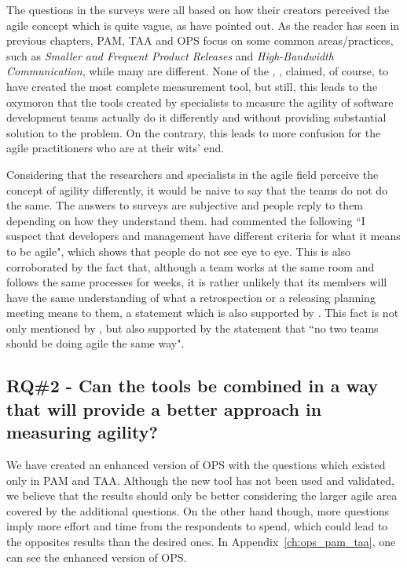 The questions in the surveys were all based on how their creators perceived the agile concept which is quite vague, as \citet{tsourveloudis} have pointed out. As the reader has seen in previous chapters, \ac{PAM}, \ac{TAA} and \ac{OPS} focus on some common areas/practices, such as  \textit{Smaller and Frequent Product Releases} and \textit{High-Bandwidth Communication}, while many are different. None of the \citet{sventha_dissertation}, \citet{pam}, \citet{Leffingwell} claimed, of course, to have created the most complete measurement tool, but still, this leads to the oxymoron that the tools created by specialists to measure the agility of software development teams actually do it differently and without providing substantial solution to the problem. On the contrary, this leads to more confusion for the agile practitioners who are at their wits' end.

Considering that the researchers and specialists in the agile field perceive the concept of agility differently, it would be naive to say that the teams do not do the same. The answers to surveys are subjective and people reply to them depending on how they understand them. \citet{ambler} had commented the following ``I suspect that developers and management have different criteria for what it means to be agile", which shows that people do not see eye to eye. This is also corroborated by the fact that, although a team works at the same room and follows the same processes for weeks, it is rather unlikely that its members will have the same understanding of what a retrospection or a releasing planning meeting means to them, a statement which is also supported by \citet{Williams_Microsoft}. This fact is not only mentioned by \citet{Dave_Thomas}, but also supported by the statement that ``no two teams should be doing agile the same way".

\subsection{RQ\#2 - Can the tools be combined in a way that will provide a better approach in measuring agility?}

We have created an enhanced version of \ac{OPS} with the questions which existed only in \ac{PAM} and \ac{TAA}. Although the new tool has not been used and validated, we believe that the results should only be better considering the larger agile area covered by the additional questions. On the other hand though, more questions imply more effort and time from the respondents to spend, which could lead to the opposites results than the desired ones. In Appendix~\ref{ch:ops_pam_taa}, one can see the enhanced version of \ac{OPS}.

